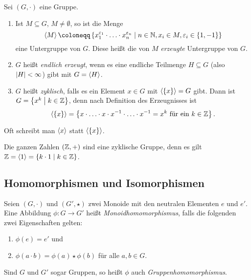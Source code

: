 {\begin{definition}[Erzeugnis]
  Sei $(G,\cdot)$ eine Gruppe.
  \begin{enumerate}
    \item Ist $M \subseteq G$, $M \neq \emptyset$, so ist die Menge
    \[\ip{M} \coloneqq \left\{x_1^{\epsilon_1} \cdot \ldots \cdot x_n^{\epsilon_n} \suchthat n \in \NN, x_i \in M, \epsilon_i \in \{1,-1\}\right\}\] eine Untergruppe von $G$. Diese heißt die von $M$ \emph{erzeugte} Untergruppe von $G$.
    \item $G$ heißt \emph{endlich erzeugt}, wenn es eine endliche Teilmenge $H \subseteq G$ (also ${\left\lvert H \right\rvert} < \infty$) gibt mit $G = \left\langle H \right\rangle$.
    \item $G$ heißt \emph{zyklisch}, falls es ein Element $x \in G$ mit $\left\langle \{x\} \right\rangle = G$ gibt. Dann ist $G = \left\{x^k \suchthat k \in \ZZ \right\}$, denn nach Definition des Erzeugnisses ist \[\left\langle \{x\} \right\rangle = \left\{x \cdot \ldots \cdot x \cdot x^{-1} \cdot \ldots \cdot x^{-1} = x^k \text{ für ein } k \in \mathbb{Z} \right\}.\]
  \end{enumerate}
\end{definition}

\begin{notation}
  Oft schreibt man $\left\langle x \right\rangle$ statt $\left\langle \{x\} \right\rangle$.
\end{notation}

\begin{example}
  Die ganzen Zahlen $(\mathbb{Z},+)$ sind eine zyklische Gruppe, denn es gilt $\ZZ = \ip{1} = \left\{k \cdot 1 \suchthat k \in \ZZ \right\}$.
\end{example}

\subsection{Homomorphismen und Isomorphismen}

\begin{definition}[Homomorphismus]\label{def:algebra:homomorphismus}
  Seien $(G,\cdot)$ und $(G',\star)$ zwei Monoide mit den neutralen Elementen $e$ und $e'$. Eine Abbildung $\phi \colon G \rightarrow G'$ heißt \emph{Monoidhomomorphismus}, falls die folgenden zwei Eigenschaften gelten:
  \begin{enumerate}
    \item $\phi(e) = e'$ und
    \item $\phi(a \cdot b) = \phi(a) \star \phi(b)$ für alle $a,b \in G$.
  \end{enumerate}
  Sind $G$ und $G'$ sogar Gruppen, so heißt $\phi$ auch \emph{Gruppenhomomorphismus}.
\end{definition}

}
